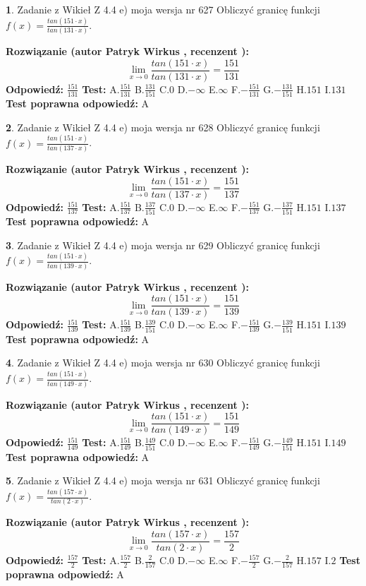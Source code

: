 \documentclass[12pt, a4paper]{article}
\theoremstyle{definition} %
\newtheorem{zad}{}
\newcommand{\zadStart}[1]{\begin{zad}#1\newline}
\newcommand{\zadStop}{\end{zad}}
\newcommand{\rozwStart}[2]{\noindent \textbf{Rozwiązanie (autor #1 , recenzent #2): }\newline}
\newcommand{\rozwStop}{\newline}
\newcommand{\odpStart}{\noindent \textbf{Odpowiedź:}\newline}
\newcommand{\odpStop}{\newline}
\newcommand{\testStart}{\noindent \textbf{Test:}\newline}
\newcommand{\testStop}{\newline}
\newcommand{\kluczStart}{\noindent \textbf{Test poprawna odpowiedź:}\newline}
\newcommand{\kluczStop}{\newline}
\begin{document}
\zadStart{Zadanie z Wikieł Z 4.4 e) moja wersja nr 627}
Obliczyć granicę funkcji $f(x)=\frac{tan(151\cdot x)}{tan(131\cdot x)}$.
\zadStop
\rozwStart{Patryk Wirkus}{}
$$\lim\limits_{x\to 0}\frac{tan(151\cdot x)}{tan(131\cdot x)}=
\frac{151}{131}$$
\rozwStop
\odpStart
$\frac{151}{131}$
\odpStop
\testStart
A.$\frac{151}{131}$
B.$\frac{131}{151}$
C.$0$
D.$-\infty$
E.$\infty$
F.$-\frac{151}{131}$
G.$-\frac{131}{151}$
H.$151$
I.$131$
\testStop
\kluczStart
A
\kluczStop



\zadStart{Zadanie z Wikieł Z 4.4 e) moja wersja nr 628}
Obliczyć granicę funkcji $f(x)=\frac{tan(151\cdot x)}{tan(137\cdot x)}$.
\zadStop
\rozwStart{Patryk Wirkus}{}
$$\lim\limits_{x\to 0}\frac{tan(151\cdot x)}{tan(137\cdot x)}=
\frac{151}{137}$$
\rozwStop
\odpStart
$\frac{151}{137}$
\odpStop
\testStart
A.$\frac{151}{137}$
B.$\frac{137}{151}$
C.$0$
D.$-\infty$
E.$\infty$
F.$-\frac{151}{137}$
G.$-\frac{137}{151}$
H.$151$
I.$137$
\testStop
\kluczStart
A
\kluczStop



\zadStart{Zadanie z Wikieł Z 4.4 e) moja wersja nr 629}
Obliczyć granicę funkcji $f(x)=\frac{tan(151\cdot x)}{tan(139\cdot x)}$.
\zadStop
\rozwStart{Patryk Wirkus}{}
$$\lim\limits_{x\to 0}\frac{tan(151\cdot x)}{tan(139\cdot x)}=
\frac{151}{139}$$
\rozwStop
\odpStart
$\frac{151}{139}$
\odpStop
\testStart
A.$\frac{151}{139}$
B.$\frac{139}{151}$
C.$0$
D.$-\infty$
E.$\infty$
F.$-\frac{151}{139}$
G.$-\frac{139}{151}$
H.$151$
I.$139$
\testStop
\kluczStart
A
\kluczStop



\zadStart{Zadanie z Wikieł Z 4.4 e) moja wersja nr 630}
Obliczyć granicę funkcji $f(x)=\frac{tan(151\cdot x)}{tan(149\cdot x)}$.
\zadStop
\rozwStart{Patryk Wirkus}{}
$$\lim\limits_{x\to 0}\frac{tan(151\cdot x)}{tan(149\cdot x)}=
\frac{151}{149}$$
\rozwStop
\odpStart
$\frac{151}{149}$
\odpStop
\testStart
A.$\frac{151}{149}$
B.$\frac{149}{151}$
C.$0$
D.$-\infty$
E.$\infty$
F.$-\frac{151}{149}$
G.$-\frac{149}{151}$
H.$151$
I.$149$
\testStop
\kluczStart
A
\kluczStop



\zadStart{Zadanie z Wikieł Z 4.4 e) moja wersja nr 631}
Obliczyć granicę funkcji $f(x)=\frac{tan(157\cdot x)}{tan(2\cdot x)}$.
\zadStop
\rozwStart{Patryk Wirkus}{}
$$\lim\limits_{x\to 0}\frac{tan(157\cdot x)}{tan(2\cdot x)}=
\frac{157}{2}$$
\rozwStop
\odpStart
$\frac{157}{2}$
\odpStop
\testStart
A.$\frac{157}{2}$
B.$\frac{2}{157}$
C.$0$
D.$-\infty$
E.$\infty$
F.$-\frac{157}{2}$
G.$-\frac{2}{157}$
H.$157$
I.$2$
\testStop
\kluczStart
A
\kluczStop
\end{document}
